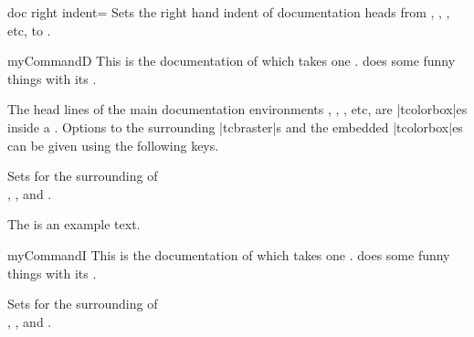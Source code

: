 \begin{docTcbKey}{doc right indent}{=}{\tcbdocdescInit{0pt}}
  Sets the right hand indent of documentation heads from
  , , , etc, to .
\begin{dispExample}
\begin{docCommand*}[doc right indent=-10mm,doc right=10mm,
    doc description=test value]{myCommandD}{}
  This is the documentation of  which takes one .
   does some funny things with its .
\end{docCommand*}
\end{dispExample}
\end{docTcbKey}

\clearpage
The head lines of the main documentation environments ,
, , etc, are |tcolorbox|es inside a
.
Options to the surrounding |tcbraster|s and the embedded
|tcolorbox|es can be given using the following keys.


\begin{docTcbKeys}[
  doc name              = doc raster command,
  doc parameter eq meta = options,
  doc description init empty,
  doc new              = 2020-04-24,
]{}
  Sets  for the surrounding  of\\
  , , and .

\begin{dispExample}

The is an example text.

\begin{docCommand*}{myCommandI}{}
  This is the documentation of  which takes one .
   does some funny things with its .
\end{docCommand*}
\end{dispExample}

\end{docTcbKeys}


\begin{docTcbKeys}[
  doc name               = doc raster environment,
  doc parameter eq meta = options,
  doc description init empty,
  doc new         = 2020-04-24,
]{}
  Sets  for the surrounding  of\\
  , , and .
\end{docTcbKeys}


